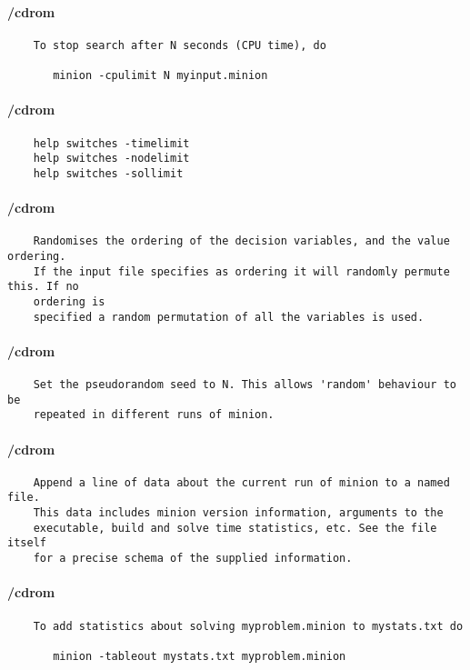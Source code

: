 \paragraph{/cdrom}
{\footnotesize
\begin{verbatim}
    To stop search after N seconds (CPU time), do

       minion -cpulimit N myinput.minion
\end{verbatim}
}
\paragraph{/cdrom}
{\footnotesize
\begin{verbatim}
    help switches -timelimit
    help switches -nodelimit
    help switches -sollimit
\end{verbatim}
}
\paragraph{/cdrom}
{\footnotesize
\begin{verbatim}
    Randomises the ordering of the decision variables, and the value ordering.
    If the input file specifies as ordering it will randomly permute this. If no
    ordering is
    specified a random permutation of all the variables is used.
\end{verbatim}
}
\paragraph{/cdrom}
{\footnotesize
\begin{verbatim}
    Set the pseudorandom seed to N. This allows 'random' behaviour to be
    repeated in different runs of minion.
\end{verbatim}
}
\paragraph{/cdrom}
{\footnotesize
\begin{verbatim}
    Append a line of data about the current run of minion to a named file.
    This data includes minion version information, arguments to the
    executable, build and solve time statistics, etc. See the file itself
    for a precise schema of the supplied information.
\end{verbatim}
}
\paragraph{/cdrom}
{\footnotesize
\begin{verbatim}
    To add statistics about solving myproblem.minion to mystats.txt do

       minion -tableout mystats.txt myproblem.minion
\end{verbatim}
}
